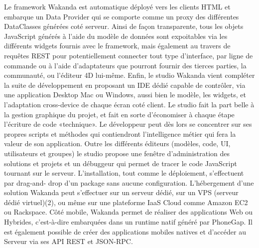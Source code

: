 Le framework Wakanda est automatique déployé vers les clients HTML et embarque un Data Provider qui se comporte comme un proxy des différentes DataClasses générées coté serveur. Ainsi de façon transparente, tous les objets JavaScript générés à l’aide du modèle de données sont expoitables via les différents widgets fournis avec le framework, mais également au travers de requêtes REST pour potentiellement connecter tout type d’interface, par ligne de commande ou à l’aide d’adaptateurs que pourront fournir des tierces parties, la communauté, ou l’éditeur 4D lui-même.
Enfin, le studio Wakanda vient compléter la suite de développement en proposant un IDE dédié capable de contrôler, via une application Desktop Mac ou Windows, aussi bien le modèle, les widgets, et l’adaptation cross-device de chaque écran coté client. Le studio fait la part belle à la gestion graphique du projet, et fait en sorte d’économiser à chaque étape l’écriture de code «technique». Le développeur peut dès lors se concentrer sur ses propres scripts et méthodes qui contiendront l’intelligence métier qui fera la valeur de son application. Outre les différents éditeurs (modèles, code, UI, utilisateurs et groupes) le studio propose une fenêtre d’administration des solutions et projets et un débuggeur qui permet de tracer le code JavaScript tournant sur le serveur. L’installation, tout comme le déploiement, s’effectuent par drag-and- drop d’un package sans aucune configuration. L’hébergement d’une solution Wakanda peut s’effectuer sur un serveur dédié, sur un VPS (serveur dédié virtuel)(2), ou même sur une plateforme IaaS Cloud comme Amazon EC2 ou Rackspace. Côté mobile, Wakanda permet de réaliser des applications Web ou Hybrides, c’est-à-dire embarquées dans un runtime natif généré par PhoneGap. Il est également possible de créer des applications mobiles natives et d’accéder au Serveur via ses API REST et JSON-RPC.
